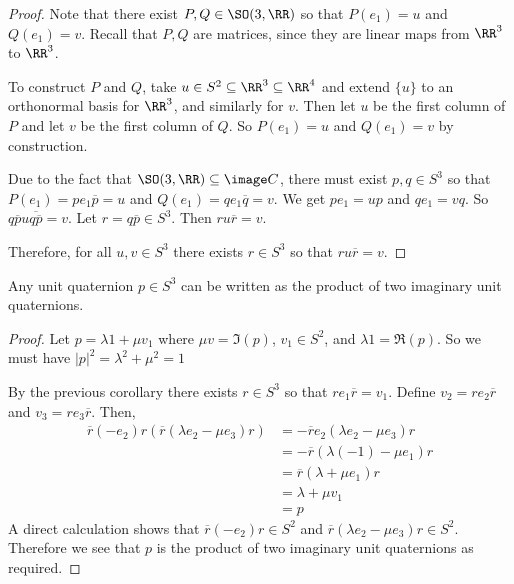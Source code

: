 \begin{proof}
Note that there exist $P,Q\in \SO(3,\RR)$ so that $P(e_1) = u$ and $Q(e_1)=v$. Recall that $P,Q$ are matrices, since they are linear maps from $\RR^3$ to $\RR^3$.

    To construct $P$ and $Q$, take $u\in S^2\subseteq \RR^3\subseteq \RR^4$ and extend $\{u\}$ to an orthonormal basis for $\RR^3$, and similarly for $v$. Then let $u$ be the first column of $P$ and let $v$ be the first column of $Q$. So $P(e_1) = u$ and $Q(e_1) = v$ by construction.
    
    Due to the fact that $\SO(3,\RR) \subseteq \image C$, there must exist $p,q \in S^3$ so that $P(e_1) = pe_1 \overline{p} = u$ and $Q(e_1) = qe_1\overline{q} = v$. We get $pe_1 = up$ and $qe_1 = vq$. So $q\overline{p}u\overline{q\overline{p}} = v$. Let $r  = q\overline{p}\in S^3$. Then $ru\overline{r} = v$.

    Therefore, for all $u,v\in S^3$ there exists $r\in S^3$ so that $ru\overline{r} = v$.
\end{proof}
\begin{cor}
    Any unit quaternion $p \in S^3$ can be written as the product of two imaginary unit quaternions.
\end{cor}
\begin{proof}
    Let $p = \lambda1 + \mu v_1$ where $\mu v= \Im(p)$, $v_1 \in S^2$, and $\lambda 1 = \Re(p)$. So we must have $|p|^2 = \lambda^2+\mu^2 = 1$

    By the previous corollary there exists $r \in S^3$ so that $re_1\overline{r} = v_1$. Define $v_2 = re_2\overline{r}$ and $v_3 = re_3\overline{r}$. Then,
    \begin{align*}
        \overline{r}(-e_2)r(\overline{r}(\lambda e_2 -\mu e_3)r)
        &= -\overline{r}e_2(\lambda e_2 - \mu e_3)r\\
        &= -\overline{r}(\lambda(-1)-\mu e_1)r\\
        &= \overline{r}(\lambda + \mu e_1)r\\
        &= \lambda + \mu v_1\\
        &= p
    \end{align*}
    A direct calculation shows that $\overline{r}(-e_2)r \in S^2 $ and $\overline{r}(\lambda e_2 -\mu e_3)r\in S^2$. Therefore we see that $p$ is the product of two imaginary unit quaternions as required.
\end{proof}

